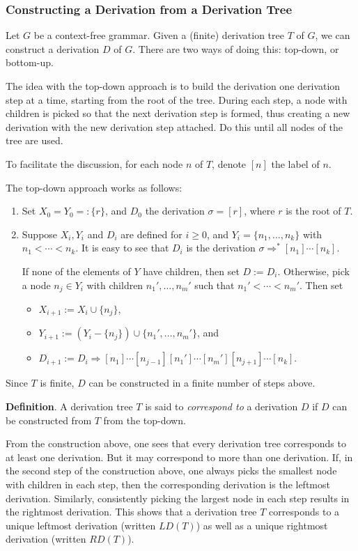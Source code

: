 \documentclass[12pt]{article}
\begin{document}
\subsubsection*{Constructing a Derivation from a Derivation Tree}

Let $G$ be a context-free grammar.  Given a (finite) derivation tree $T$ of $G$, we can construct a derivation $D$ of $G$.  There are two ways of doing this: top-down, or bottom-up.  

The idea with the top-down approach is to build the derivation one derivation step at a time, starting from the root of the tree.  During each step, a node with children is picked so that the next derivation step is formed, thus creating a new derivation with the new derivation step attached.  Do this until all nodes of the tree are used.

To facilitate the discussion, for each node $n$ of $T$, denote $[n]$ the label of $n$.

The top-down approach works as follows:
\begin{enumerate}
\item Set $X_0=Y_0=:\lbrace r \rbrace$, and $D_0$ the derivation $\sigma=[r]$, where $r$ is the root of $T$.
\item Suppose $X_i,Y_i$ and $D_i$ are defined for $i\ge 0$, and $Y_i = \lbrace n_1, \ldots, n_k \rbrace$ with $n_1 < \cdots < n_k$.  It is easy to see that $D_i$ is the derivation $\sigma \Rightarrow^* [n_1]\cdots [n_k]$.

If none of the elements of $Y$ have children, then set $D:=D_i$.  Otherwise, pick a node $n_j \in Y_i$ with children $n_1', \ldots, n_m'$ such that $n_1' < \cdots < n_m'$.  Then set 
\begin{itemize}
\item $X_{i+1}:=X_i \cup \lbrace n_j \rbrace$, 
\item $Y_{i+1} := (Y_i - \lbrace n_j \rbrace ) \cup \lbrace n_1' , \ldots, n_m'\rbrace$, and 
\item $D_{i+1} :=D_i \Rightarrow [n_1] \cdots [n_{j-1}][n_1'] \cdots [n_m'] [n_{j+1}] \cdots [n_k]$.
\end{itemize}
\end{enumerate}
Since $T$ is finite, $D$ can be constructed in a finite number of steps above.

\textbf{Definition}.  A derivation tree $T$ is said to \emph{correspond to} a derivation $D$ if $D$ can be constructed from $T$ from the top-down.

From the construction above, one sees that every derivation tree corresponds to at least one derivation.  But it may correspond to more than one derivation.  If, in the second step of the construction above, one always picks the smallest node with children in each step, then the corresponding derivation is the leftmost derivation.  Similarly, consistently picking the largest node in each step results in the rightmost derivation.  This shows that a derivation tree $T$ corresponds to a unique leftmost derivation (written $LD(T)$) as well as a unique rightmost derivation (written $RD(T)$).
\end{document}
